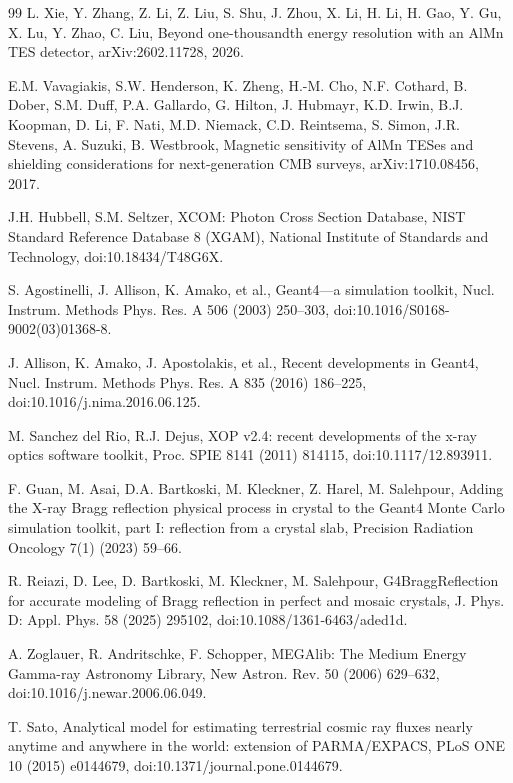 \documentclass[11pt]{article}
\begin{document}
\begin{thebibliography}{99}
L. Xie, Y. Zhang, Z. Li, Z. Liu, S. Shu, J. Zhou, X. Li, H. Li, H. Gao, Y. Gu, X. Lu, Y. Zhao, C. Liu, Beyond one-thousandth energy resolution with an AlMn TES detector, arXiv:2602.11728, 2026.

E.M. Vavagiakis, S.W. Henderson, K. Zheng, H.-M. Cho, N.F. Cothard, B. Dober, S.M. Duff, P.A. Gallardo, G. Hilton, J. Hubmayr, K.D. Irwin, B.J. Koopman, D. Li, F. Nati, M.D. Niemack, C.D. Reintsema, S. Simon, J.R. Stevens, A. Suzuki, B. Westbrook, Magnetic sensitivity of AlMn TESes and shielding considerations for next-generation CMB surveys, arXiv:1710.08456, 2017.

J.H. Hubbell, S.M. Seltzer, XCOM: Photon Cross Section Database, NIST Standard Reference Database 8 (XGAM), National Institute of Standards and Technology, doi:10.18434/T48G6X.

S. Agostinelli, J. Allison, K. Amako, et al., Geant4---a simulation toolkit, Nucl. Instrum. Methods Phys. Res. A 506 (2003) 250--303, doi:10.1016/S0168-9002(03)01368-8.

J. Allison, K. Amako, J. Apostolakis, et al., Recent developments in Geant4, Nucl. Instrum. Methods Phys. Res. A 835 (2016) 186--225, doi:10.1016/j.nima.2016.06.125.

M. Sanchez del Rio, R.J. Dejus, XOP v2.4: recent developments of the x-ray optics software toolkit, Proc. SPIE 8141 (2011) 814115, doi:10.1117/12.893911.

F. Guan, M. Asai, D.A. Bartkoski, M. Kleckner, Z. Harel, M. Salehpour, Adding the X-ray Bragg reflection physical process in crystal to the Geant4 Monte Carlo simulation toolkit, part I: reflection from a crystal slab, Precision Radiation Oncology 7(1) (2023) 59--66.

R. Reiazi, D. Lee, D. Bartkoski, M. Kleckner, M. Salehpour, G4BraggReflection for accurate modeling of Bragg reflection in perfect and mosaic crystals, J. Phys. D: Appl. Phys. 58 (2025) 295102, doi:10.1088/1361-6463/aded1d.

A. Zoglauer, R. Andritschke, F. Schopper, MEGAlib: The Medium Energy Gamma-ray Astronomy Library, New Astron. Rev. 50 (2006) 629--632, doi:10.1016/j.newar.2006.06.049.

T. Sato, Analytical model for estimating terrestrial cosmic ray fluxes nearly anytime and anywhere in the world: extension of PARMA/EXPACS, PLoS ONE 10 (2015) e0144679, doi:10.1371/journal.pone.0144679.


\end{thebibliography}
\end{document}
